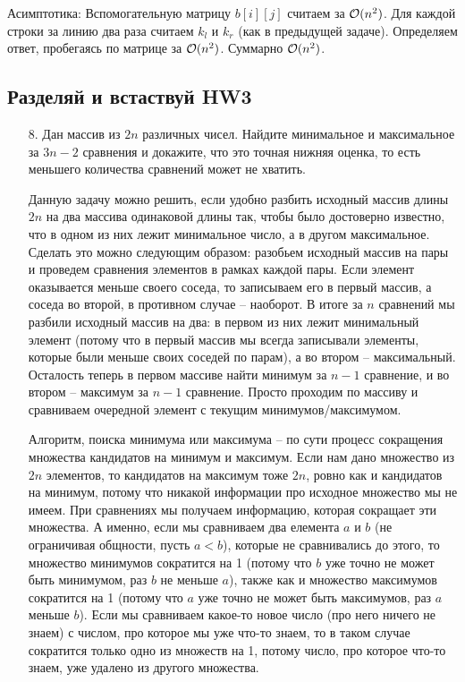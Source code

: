 \begin{enumerate}
\begin{solution}
        Асимптотика:
        Вспомогательную матрицу $b[i][j]$ считаем за $\mathcal{O}(n^2)$. Для каждой строки за линию два раза считаем $k_l$ и $k_r$ (как в предыдущей задаче). Определяем ответ, пробегаясь по матрице за $\mathcal{O}(n^2)$. Суммарно $\mathcal{O}(n^2)$.

    \end{solution}
\end{enumerate}

\subsection{Разделяй и встаствуй HW3}
\begin{enumerate}
    \item[8.] Дан массив из $2n$ различных чисел. Найдите минимальное и максимальное за $3n - 2$ сравнения и докажите, что это точная нижняя оценка, то есть меньшего количества сравнений может не хватить.
    \begin{solution}
        Данную задачу можно решить, если удобно разбить исходный массив длины $2n$ на два массива одинаковой длины так, чтобы было достоверно известно, что в одном из них лежит минимальное число, а в другом максимальное. Сделать это можно следующим образом: разобьем исходный массив на пары и проведем сравнения элементов в рамках каждой пары. Если элемент оказывается меньше своего соседа, то записываем его в первый массив, а соседа во второй, в противном случае -- наоборот. В итоге за $n$ сравнений мы разбили исходный массив на два: в первом из них лежит минимальный элемент (потому что в первый массив мы всегда записывали элементы, которые были меньше своих соседей по парам), а во втором -- максимальный. Осталость теперь в первом массиве найти минимум за $n-1$ сравнение, и во втором -- максимум за $n-1$ сравнение. Просто проходим по массиву и сравниваем очередной элемент с текущим минимумов/максимумом.

        Алгоритм, поиска минимума или максимума -- по сути процесс сокращения множества кандидатов на минимум и максимум. Если нам дано множество из $2n$ элементов, то кандидатов на максимум тоже $2n$, ровно как и кандидатов на минимум, потому что никакой информации про исходное множество мы не имеем. При сравнениях мы получаем информацию, которая сокращает эти множества. А именно, если мы сравниваем два елемента $a$ и $b$ (не ограничивая общности, пусть $a<b$), которые не сравнивались до этого, то множество минимумов сократится на 1 (потому что $b$ уже точно не может быть минимумом, раз $b$ не меньше $a$), также как и множество максимумов сократится на 1 (потому что $a$ уже точно не может быть максимумов, раз $a$ меньше $b$). Если мы сравниваем какое-то новое число (про него ничего не знаем) с числом, про которое мы уже что-то знаем, то в таком случае сократится только одно из множеств на 1, потому число, про которое что-то знаем, уже удалено из другого множества.


\end{solution}
\end{enumerate}

